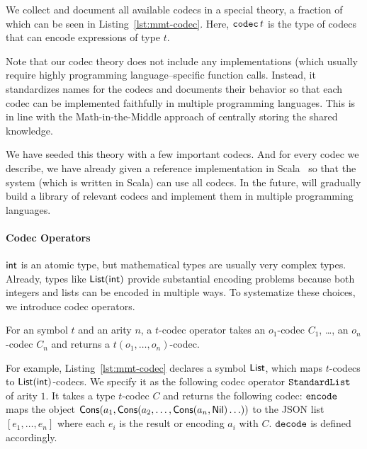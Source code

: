 

We collect and document all available codecs in a special \MMT theory, a fraction of which can be seen in Listing~\ref{lst:mmt-codec}.
Here, $\codec\,t$ is the type of codecs that can encode expressions of type $t$.

Note that our codec theory does not include any implementations (which usually require highly programming language--specific function calls.
Instead, it standardizes names for the codecs and documents their behavior so that each codec can be implemented faithfully in multiple programming languages.
This is in line with the Math-in-the-Middle approach of centrally storing the shared knowledge.

We have seeded this theory with a few important codecs.  And for every codec we describe,
we have already given a reference implementation in Scala~\cite{scala:webpage} so that the
\MMT system (which is written in Scala) can use all codecs.  In the future, \pn will
gradually build a library of relevant codecs and implement them in multiple programming
languages.

\paragraph{Codec Operators}
$\Int$ is an atomic type, but mathematical types are usually very complex types.
Already, types like $\lst(\Int)$ provide substantial encoding problems because both integers and lists can be encoded in multiple ways.
To systematize these choices, we introduce codec operators.

\begin{mydef}
  For an \MMT symbol $t$ and an arity $n$, a $t$-codec operator takes an $o_1$-codec $C_1$, \ldots, an $o_n$-codec $C_n$ and returns a $t(o_1,\ldots,o_n)$-codec.
\end{mydef}

For example, Listing~\ref{lst:mmt-codec} declares a symbol $\lst$, which maps $t$-codecs to $\lst(\Int)$-codecs.
We specify it as the following codec operator $\standardList$ of arity $1$.
It takes a type $t$-codec $C$ and returns the following codec: $\enc$ maps the object $\cons(a_1,\cons(a_2,\ldots,\cons(a_n,\nil)\ldots))$ to the JSON list $[e_1,\ldots,e_n]$ where each $e_i$ is the result or encoding $a_i$ with $C$.
$\dec$ is defined accordingly.

